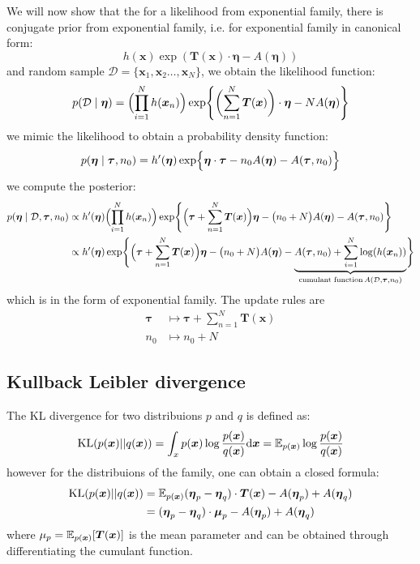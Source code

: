 We will now show that the for a likelihood from exponential family, there is conjugate prior from exponential family, i.e. for exponential family in canonical form: 
$$
h(\boldsymbol{x}) \exp( \boldsymbol{T}(\boldsymbol{x}) \cdot \boldsymbol{\eta} - A(\boldsymbol{\eta}))
$$
and random sample $\mathcal{D} = \{\boldsymbol{x}_1,\boldsymbol{x}_2\dots,\boldsymbol{x}_N\}$, we obtain the likelihood function:
$$
p(\mathcal{D}\mid \boldsymbol{\eta}) = \Bigl(\prod_{i=1}^N h(\boldsymbol{x}_n)\Bigr) \exp \Biggl\{ \biggl( \sum_{n=1}^N \boldsymbol{T}(\boldsymbol{x}) \biggr) \cdot \boldsymbol{\eta} - N A(\boldsymbol{\eta}) \Biggr\}
$$
we mimic the likelihood to obtain a probability density function:
$$ 
p(\boldsymbol{\eta} \mid \boldsymbol{\tau},n_0) = h^\prime(\boldsymbol{\eta}) \exp \Bigl\{ \boldsymbol{\eta} \cdot \boldsymbol{\tau} - n_0 A(\boldsymbol{\eta}) - A(\boldsymbol{\tau}, n_0)\Bigr\}
$$
we compute the posterior:
\begin{align*}
    p(\boldsymbol{\eta} \mid \mathcal{D},\boldsymbol{\tau},n_0) &\propto h^\prime(\boldsymbol{\eta})\Bigl(\prod_{i=1}^N h(\boldsymbol{x}_n)\Bigr) \exp \Biggl\{  \Bigl( \boldsymbol{\tau} +\sum_{n=1}^N \boldsymbol{T}(\boldsymbol{x}) \Bigr) \boldsymbol{\eta} - \bigl( n_0 + N\bigr)A(\boldsymbol{\eta}) - A(\boldsymbol{\tau}, n_0) \Biggr\}\\
 &\propto h^\prime(\boldsymbol{\eta}) \exp \Biggl\{  \Bigl( \boldsymbol{\tau} +\sum_{n=1}^N \boldsymbol{T}(\boldsymbol{x}) \Bigr) \boldsymbol{\eta} - \bigl( n_0 + N\bigr)A(\boldsymbol{\eta}) - \underbrace{A(\boldsymbol{\tau}, n_0) + \sum_{i=1}^{N} \log (h(\boldsymbol{x}_n))}_{\text{cumulant function}\,A(\mathcal{D},\boldsymbol{\tau},n_0)} \Biggr\}
\end{align*}
which is in the form of exponential family. The update rules are
\begin{align*}
\boldsymbol{\tau} &\mapsto \boldsymbol{\tau}  +\sum_{n=1}^N \boldsymbol{T}(\boldsymbol{x}) \\
n_0 &\mapsto n_0 + N 
\end{align*}
\subsection{Kullback Leibler divergence}
The KL divergence for two distribuions $p$ and $q$ is defined as:
$$
\mathrm{KL}(p(\boldsymbol{x}) || q(\boldsymbol{x})) = \int_x p(\boldsymbol{x}) \log \frac{p(\boldsymbol{x})}{q(\boldsymbol{x})} \mbox{\rm d}\boldsymbol{x} 
= \operatorname{\mathbb{E}}_{p(\boldsymbol{x})} \log \frac{p(\boldsymbol{x})}{q(\boldsymbol{x})} 
$$
however for the distribuions of the family, one can obtain a closed formula:
\begin{align*}
    \mathrm{KL}(p(\boldsymbol{x}) || q(\boldsymbol{x})) &= \operatorname{\mathbb{E}}_{p(\boldsymbol{x})} (\boldsymbol{\eta}_p - \boldsymbol{\eta}_q) \cdot  \boldsymbol{T}(\boldsymbol{x}) - A(\boldsymbol{\eta}_p) + A(\boldsymbol{\eta}_q) \\
    &= (\boldsymbol{\eta}_p - \boldsymbol{\eta}_q) \cdot  \boldsymbol{\mu}_p - A(\boldsymbol{\eta}_p) + A(\boldsymbol{\eta}_q) \\
\end{align*}
where $\mu_p =\operatorname{\mathbb{E}}_{p(\boldsymbol{x})}[\boldsymbol{T}(\boldsymbol{x})] $ is the mean parameter and can be obtained through differentiating the cumulant function. 

